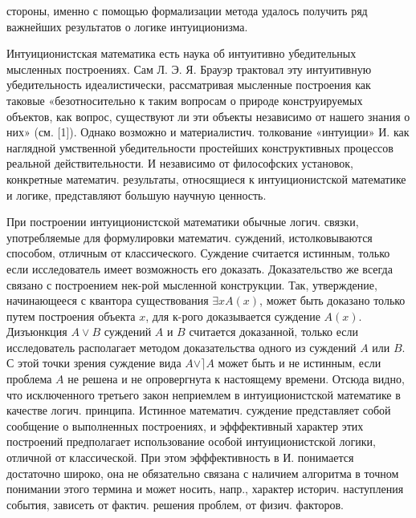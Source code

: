 \documentclass[10pt]{article}
\begin{document}
стороны, именно с помощью формализации метода удалось получить ряд важнейших результатов о логике интуиционизма.



Интуиционистская математика есть наука об интуитивно убедительных мысленных построениях. Сам Л. Э. Я. Брауэр трактовал эту интуитивную убедительность идеалистически, рассматривая мысленные построения как таковые «безотносительно к таким вопросам о природе конструируемых объектов, как вопрос, существуют ли эти объекты независимо от нашего знания о них» (см. [1]). Однако возможно и материалистич. толкование «интуиции» И. как наглядной умственной убедительности простейших конструктивных процессов реальной действительности. И независимо от философских установок, конкретные математич. результаты, относящиеся к интуиционистской математике и логике, представляют большую научную ценность.



При построении интуиционистской математики обычные логич. связки, употребляемые для формулировки математич. суждений, истолковываются способом, отличным от классического. Суждение считается истинным, только если исследователь имеет возможность его доказать. Доказательство же всегда связано с построением нек-рой мысленной конструкции. Так, утверждение, начинающееся с квантора существования $\exists x A(x)$, может быть доказано только путем построения объекта $x$, для к-рого доказывается суждение $A(x)$. Дизъюнкция $A \vee B$ суждений $A$ и $B$ считается доказанной, только если исследователь располагает методом доказательства одного из суждений $A$ или $B$. С этой точки зрения суждение вида $A \vee\rceil A$ может быть и не истинным, если проблема $A$ не решена и не опровергнута к настоящему времени. Отсюда видно, что исключенного третьего закон неприемлем в интуиционистской математике в качестве логич. принципа. Истинное математич. суждение представляет собой сообщение о выполненных построениях, и эфффективный характер этих построений предполагает использование особой интуиционистской логики, отличной от классической. При этом эфффективность в И. понимается достаточно широко, она не обязательно связана с наличием алгоритма в точном понимании этого термина и может носить, напр., характер историч. наступления события, зависеть от фактич. решения проблем, от физич. факторов.
\end{document}
